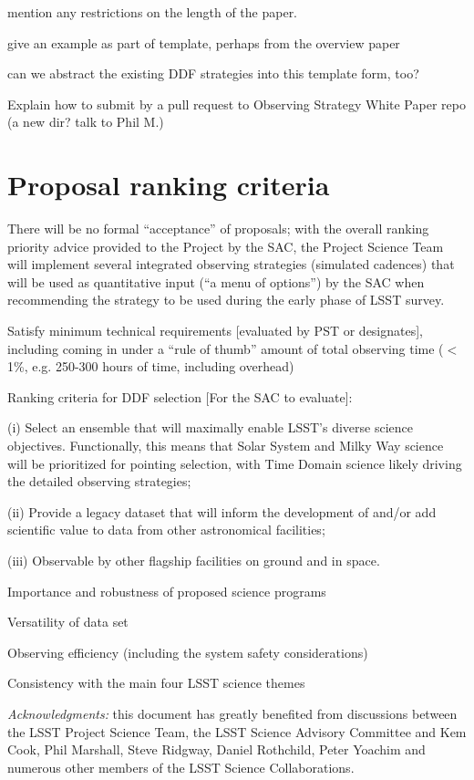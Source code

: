 \documentclass[DM,lsstdraft,toc,usenatbib]{lsstdoc}
\begin{document}
mention any restrictions on the length of the paper. 

give an example as part of template, perhaps from the overview paper

can we abstract the existing DDF strategies into this template form, too? 


Explain how to submit by a pull request to Observing Strategy White Paper repo
(a new dir? talk to Phil M.) 




\section{Proposal ranking criteria} 

There will be no formal ``acceptance'' of proposals; with the overall ranking priority 
advice provided to the Project by the SAC, the Project Science Team will implement several 
integrated observing strategies (simulated cadences) that will be used as quantitative input
(``a menu of options'') by the SAC when recommending the strategy to be used during the 
early phase of LSST survey. 


Satisfy minimum technical requirements [evaluated by PST or designates], including coming in under a 
``rule of thumb'' amount of total observing time ($<$1\%, e.g. 250-300 hours of time, including overhead)

Ranking criteria for DDF selection [For the SAC to evaluate]:  

(i) Select an ensemble that will maximally enable LSST’s diverse science objectives. Functionally, this means that Solar System and Milky Way science will be prioritized for pointing selection, with Time Domain science likely driving the detailed observing strategies;  

(ii) Provide a legacy dataset that will inform the development of and/or add scientific value to data from other astronomical facilities;  

(iii) Observable by other flagship facilities on ground and in space.



Importance and robustness of proposed science programs

Versatility of data set

Observing efficiency (including the system safety considerations) 

Consistency with the main four LSST science themes 


\vskip 0.0in
\newpage
{\it Acknowledgments:} this document has greatly benefited from discussions between 
the LSST Project Science Team, the LSST Science Advisory Committee and Kem Cook, 
Phil Marshall, Steve Ridgway, Daniel Rothchild, Peter Yoachim and numerous other members 
of the LSST Science Collaborations. 
\end{document}
